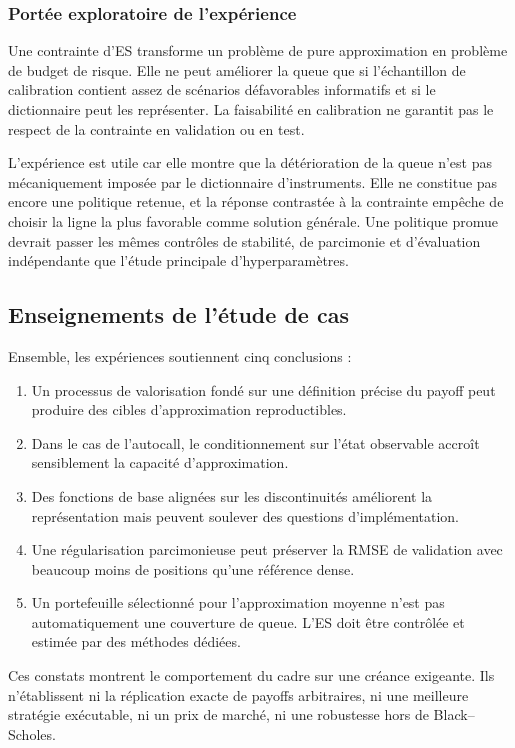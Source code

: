 \subsubsection*{Portée exploratoire de l'expérience}

Une contrainte d'ES transforme un problème de pure approximation en problème de budget de risque. Elle ne peut améliorer la queue que si l'échantillon de calibration contient assez de scénarios défavorables informatifs et si le dictionnaire peut les représenter. La faisabilité en calibration ne garantit pas le respect de la contrainte en validation ou en test.

L'expérience est utile car elle montre que la détérioration de la queue n'est pas mécaniquement imposée par le dictionnaire d'instruments. Elle ne constitue pas encore une politique retenue, et la réponse contrastée à la contrainte empêche de choisir la ligne la plus favorable comme solution générale. Une politique promue devrait passer les mêmes contrôles de stabilité, de parcimonie et d'évaluation indépendante que l'étude principale d'hyperparamètres.

\subsection{Enseignements de l'étude de cas}

Ensemble, les expériences soutiennent cinq conclusions :

\begin{enumerate}
\item Un processus de valorisation fondé sur une définition précise du payoff peut produire des cibles d'approximation reproductibles.
\item Dans le cas de l'autocall, le conditionnement sur l'état observable accroît sensiblement la capacité d'approximation.
\item Des fonctions de base alignées sur les discontinuités améliorent la représentation mais peuvent soulever des questions d'implémentation.
\item Une régularisation parcimonieuse peut préserver la RMSE de validation avec beaucoup moins de positions qu'une référence dense.
\item Un portefeuille sélectionné pour l'approximation moyenne n'est pas automatiquement une couverture de queue. L'ES doit être contrôlée et estimée par des méthodes dédiées.
\end{enumerate}

Ces constats montrent le comportement du cadre sur une créance exigeante. Ils n'établissent ni la réplication exacte de payoffs arbitraires, ni une meilleure stratégie exécutable, ni un prix de marché, ni une robustesse hors de Black--Scholes.

